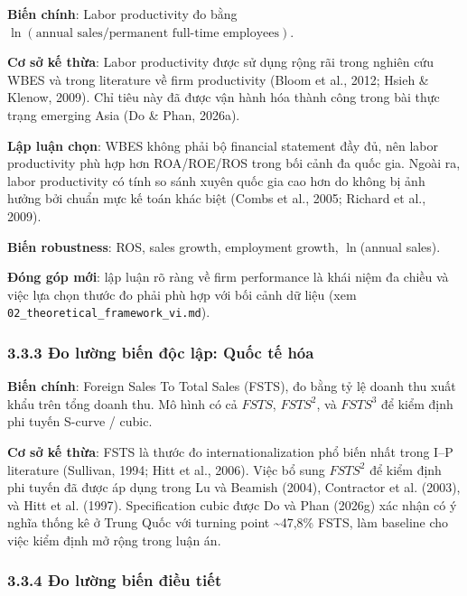 \documentclass[12pt,a4paper]{article}
\begin{document}
\textbf{Biến chính}: Labor productivity đo bằng
\(\ln(\text{annual sales} / \text{permanent full-time employees})\).

\textbf{Cơ sở kế thừa}: Labor productivity được sử dụng rộng rãi trong
nghiên cứu WBES và trong literature về firm productivity (Bloom et al.,
2012; Hsieh \& Klenow, 2009). Chỉ tiêu này đã được vận hành hóa thành
công trong bài thực trạng emerging Asia (Do \& Phan, 2026a).

\textbf{Lập luận chọn}: WBES không phải bộ financial statement đầy đủ,
nên labor productivity phù hợp hơn ROA/ROE/ROS trong bối cảnh đa quốc
gia. Ngoài ra, labor productivity có tính so sánh xuyên quốc gia cao hơn
do không bị ảnh hưởng bởi chuẩn mực kế toán khác biệt (Combs et al.,
2005; Richard et al., 2009).

\textbf{Biến robustness}: ROS, sales growth, employment growth,
\(\ln\)(annual sales).

\textbf{Đóng góp mới}: lập luận rõ ràng về firm performance là khái niệm
đa chiều và việc lựa chọn thước đo phải phù hợp với bối cảnh dữ liệu
(xem \texttt{02\_theoretical\_framework\_vi.md}).

\hypertarget{333-ux111o-lux1b0ux1eddng-biux1ebfn-ux111ux1ed9c-lux1eadp-quux1ed1c-tux1ebf-huxf3a}{%
\subsubsection{3.3.3 Đo lường biến độc lập: Quốc tế
hóa}\label{333-ux111o-lux1b0ux1eddng-biux1ebfn-ux111ux1ed9c-lux1eadp-quux1ed1c-tux1ebf-huxf3a}}

\textbf{Biến chính}: Foreign Sales To Total Sales (FSTS), đo bằng tỷ lệ
doanh thu xuất khẩu trên tổng doanh thu. Mô hình có cả \(FSTS\),
\(FSTS^2\), và \(FSTS^3\) để kiểm định phi tuyến S-curve / cubic.

\textbf{Cơ sở kế thừa}: FSTS là thước đo internationalization phổ biến
nhất trong I--P literature (Sullivan, 1994; Hitt et al., 2006). Việc bổ
sung \(FSTS^2\) để kiểm định phi tuyến đã được áp dụng trong Lu và
Beamish (2004), Contractor et al. (2003), và Hitt et al. (1997).
Specification cubic được Do và Phan (2026g) xác nhận có ý nghĩa thống kê
ở Trung Quốc với turning point \textasciitilde47,8\% FSTS, làm baseline
cho việc kiểm định mở rộng trong luận án.

\hypertarget{334-ux111o-lux1b0ux1eddng-biux1ebfn-ux111iux1ec1u-tiux1ebft}{%
\subsubsection{3.3.4 Đo lường biến điều
tiết}\label{334-ux111o-lux1b0ux1eddng-biux1ebfn-ux111iux1ec1u-tiux1ebft}}
\end{document}
